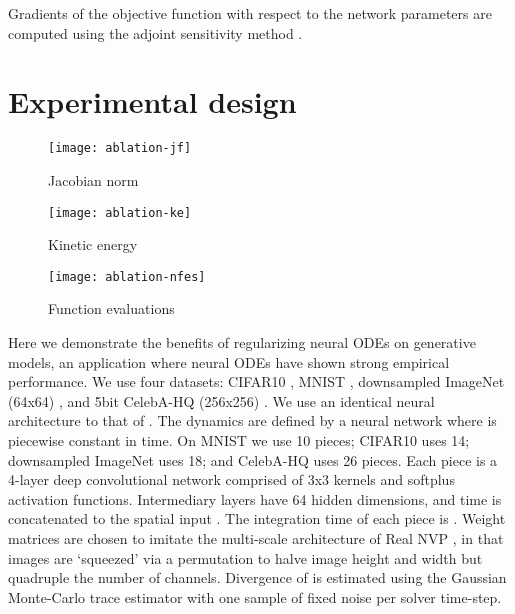 \documentclass{article}
\theoremstyle{definition}
\theoremstyle{remark}
\begin{document}
Gradients of the objective function with respect to
the network parameters are computed using the adjoint sensitivity method
\cite{pontryagin1962mathematical,chen2018neural}.






 \addtocounter{footnote}{0}
\section{Experimental design}
\begin{figure*}[ht]
  \vskip 0.2in
    \centering
    \begin{subfigure}[t]{.33\textwidth}
      \texttt{[image: ablation-jf]}
    \caption{Jacobian norm}\label{fig:jf}
    \end{subfigure}
\begin{subfigure}[t]{.33\textwidth}
      \texttt{[image: ablation-ke]}
    \caption{Kinetic energy}\label{fig:ke}
  \end{subfigure}
    \begin{subfigure}[t]{.33\textwidth}
      \texttt{[image: ablation-nfes]}
    \caption{Function evaluations}\label{fig:nfes}
  \end{subfigure}
  \caption{Ablation study of the effect of the two regularizers, comparing two measures of flow regularity during training with a fixed
    step-size ODE solver.  Figure
  \ref{fig:jf}: mean Jacobian Frobenius norm as a function of training
epoch.  Figure \ref{fig:ke}: mean kinetic energy of the flow as a function of
training epoch. Figure \ref{fig:nfes}: number of function evaluations.}\label{fig:ablation}
\end{figure*}
Here we demonstrate the benefits of regularizing neural ODEs on generative
models, an application where neural ODEs have shown strong empirical
performance. We use four datasets: CIFAR10 \citep{cifar},  MNIST \cite{mnist},
downsampled ImageNet (64x64) \cite{imagenet64}, and 5bit CelebA-HQ (256x256) \cite{celebahq}. We use an 
identical neural architecture to that of \citet{grathwohl_ffjord}. 
The dynamics are defined by a neural network  where  is piecewise
constant in time.  On MNIST we use
10 pieces; CIFAR10 uses 14; downsampled ImageNet uses 18; and CelebA-HQ uses 26
pieces. Each piece is a 4-layer deep convolutional network
comprised of 3x3
kernels and softplus activation functions. Intermediary layers have 64 hidden
dimensions, and time  is concatenated to the spatial input . The
integration time of each piece is . Weight matrices
are chosen to imitate the multi-scale architecture of Real NVP \citep{realnvp},
in that images are `squeezed' via a permutation to halve image height
and width but quadruple the number of channels. 
Divergence of  is estimated using the Gaussian Monte-Carlo trace
estimator with one sample of
fixed noise per solver time-step.
\end{document}
